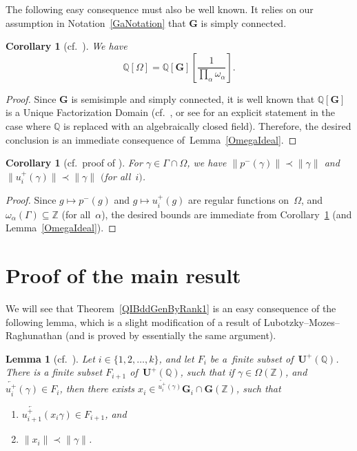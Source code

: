 \documentclass[pdftex]{sigma}
\newcommand{\QQ}{\mathbb{Q}}
\newcommand{\ZZ}{\mathbb{Z}}
\newcommand{\Ga}{\mathbf{G}}
\newcommand{\Ua}{\mathbf{U}}
\newcommand{\la}{\overleftarrow}
\numberwithin{equation}{section}
\newtheorem{lem}[thm]{Lemma}
\newtheorem{cor}[thm]{Corollary}
\theoremstyle{definition}
\begin{document}
The following easy consequence must also be well known.
It relies on our assumption in Notation~\ref{GaNotation} that $\Ga$ is simply connected.

\begin{cor}[cf.\ {\cite[Lemma~4.11(ii)]{MR1828742}}] \label{F[Omega]}
We have
	\[\QQ[\Omega] = \QQ[\Ga] \left[ \frac{1}{\prod_\alpha \omega_\alpha} \right] .\]
\end{cor}

\begin{proof}
Since $\Ga$ is semisimple and simply connected, it is well known that $\QQ[\Ga]$ is a Unique Factorization Domain (cf.\ \cite[Proposition~3.4]{Rosengarten-Picard}, or see \cite[Corollary~on p.~303]{Popov-Picard} for an explicit statement in the case where $\QQ$ is replaced with an algebraically closed field). Therefore, the desired conclusion is an immediate consequence of~Lemma~\ref{OmegaIdeal}.
\end{proof}

\begin{cor}[cf.\ proof of {\cite[Lemma~4.11(iii)]{MR1828742}}] \label{ubdd}
For $\gamma \in \Gamma \cap \Omega$, we have $\| p^-(\gamma) \| \prec \| \gamma \|$
and $\|u^+_i(\gamma) \| \prec \| \gamma \|$ $($for all~$i)$.
\end{cor}

\begin{proof}Since $g \mapsto p^-(g)$ and $g \mapsto u^+_i(g)$ are regular functions on~$\Omega$, and $\omega_\alpha(\Gamma) \subseteq \ZZ$ (for all~$\alpha$), the desired bounds are immediate from Corollary~\ref{F[Omega]} (and Lemma~\ref{OmegaIdeal}).
\end{proof}

\section{Proof of the main result} \label{MainProofSect}

We will see that Theorem~\ref{QIBddGenByRank1} is an easy consequence of the following lemma, which is a slight modification of a result of Lubotzky--Mozes--Raghunathan (and is proved by essentially the same argument).

\begin{lem}[cf.\ {\cite[paragraphs~4.19, 4.21, and 4.22]{MR1828742}}] \label{OneStep}
Let $i \in \{1,2,\ldots,k\}$, and let $F_i$ be a~finite subset of~$\Ua^+(\QQ)$.
There is a finite subset $F_{i+1}$ of~$\Ua^+(\QQ)$, such that if $\gamma \in \Omega(\ZZ)$, and $\la{u^+_i}(\gamma) \in F_i$, then there exists $x_i \in {}^{\la{u^+_i}(\gamma)}\Ga_i \cap \Ga(\ZZ)$, such that
\begin{enumerate}\itemsep=0pt
\item[$1)$] %
	$\la{u^+_{i+1}}(x_i \gamma) \in F_{i+1}$, and
\item[$2)$] %
	$\| x_i \| \prec \| \gamma \|$.
\end{enumerate}
\end{lem}
\end{document}

